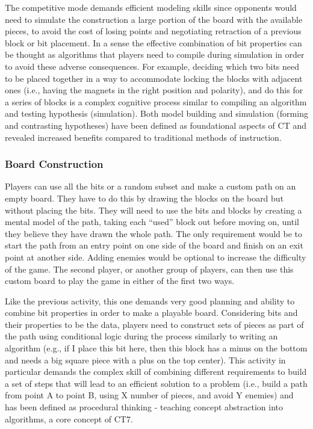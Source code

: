 \documentclass{acm_proc_article-sp}
\begin{document}
The competitive mode demands efficient modeling skills since opponents would need to simulate the construction a large portion of the board with the available pieces, to avoid the cost of losing points and negotiating retraction of a previous block or bit placement. In a sense the effective combination of bit properties can be thought as algorithms that players need to compile during simulation in order to avoid these adverse consequences. For example, deciding which two bits need to be placed together in a way to accommodate locking the blocks with adjacent ones (i.e., having the magnets in the right position and polarity), and do this for a series of blocks is a complex cognitive process similar to compiling an algorithm and testing hypothesis (simulation). Both model building and simulation (forming and contrasting hypotheses) have been defined as foundational aspects of CT and revealed increased benefits compared to traditional methods of instruction.

\subsubsection{Board Construction}
Players can use all the bits or a random subset and make a custom path on an empty board. They have to do this by drawing the blocks on the board but without placing the bits. They will need to use the bits and blocks by creating a mental model of the path, taking each “used” block out before moving on, until they believe they have drawn the whole path. The only requirement would be to start the path from an entry point on one side of the board and finish on an exit point at another side. Adding enemies would be optional to increase the difficulty of the game. The second player, or another group of players, can then use this custom board to play the game in either of the first two ways.

Like the previous activity, this one demands very good planning and ability to combine bit properties in order to make a playable board. Considering bits and their properties to be the data, players need to construct sets of pieces as part of the path using conditional logic during the process similarly to writing an algorithm (e.g., if I place this bit here, then this block has a minus on the bottom and needs a big square piece with a plus on the top center). This activity in particular demands the complex skill of combining different requirements to build a set of steps that will lead to an efficient solution to a problem (i.e., build a path from point A to point B, using X number of pieces, and avoid Y enemies) and has been defined as procedural thinking - teaching concept abstraction into algorithms, a core concept of CT7.
\end{document}
